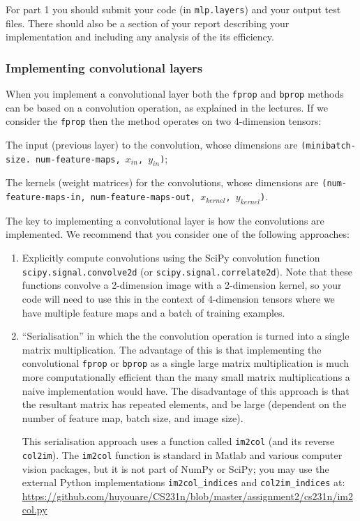 \documentclass[11pt,]{article}
\begin{document}
For part 1 you should submit  your code (in \texttt{mlp.layers}) and your output test files.  There should also be a section of your report describing your implementation and including any analysis of the its efficiency.

\subsubsection*{Implementing convolutional layers}
When you implement a convolutional layer both the \texttt{fprop} and \texttt{bprop} methods can be based on a convolution operation, as explained in the lectures.  If we consider the  \texttt{fprop} then the method operates on two 4-dimension tensors:
\begin{compactitem}
    \item The input (previous layer) to the convolution, whose dimensions are \texttt{(minibatch-size. num-feature-maps, $x_{in}$, $y_{in}$)};
    \item The kernels (weight matrices) for the convolutions,  whose dimensions are \texttt{(num-feature-maps-in, num-feature-maps-out, $x_{kernel}$, $y_{kernel}$)}.
\end{compactitem}

The key to implementing a convolutional layer is how the convolutions are implemented. We recommend that you consider one of the following approaches:
\begin{enumerate}
    \item Explicitly compute convolutions using the  SciPy convolution function \texttt{scipy.signal.convolve2d} (or \texttt{scipy.signal.correlate2d}).  Note that these functions convolve a 2-dimension image with a 2-dimension kernel, so your code will need to use this in the context of 4-dimension tensors where we have multiple feature maps and a batch of training examples.
    \item ``Serialisation'' in which the the convolution operation is turned into a single matrix multiplication.  The advantage of this is that implementing the convolutional \texttt{fprop} or \texttt{bprop} as a single large matrix multiplication is much more computationally efficient than the many small matrix multiplications a naive implementation would have.  The disadvantage of this approach is that the resultant matrix has repeated elements, and be large (dependent on the number of feature map, batch size, and image size).  
    
    This serialisation  approach uses a function called \texttt{im2col} (and its reverse \texttt{col2im}).  The \texttt{im2col} function is standard in Matlab and various computer vision packages, but it is not part of NumPy or SciPy; you may use the external Python implementations \texttt{im2col\_indices} and \texttt{col2im\_indices} at:\\ \url{https://github.com/huyouare/CS231n/blob/master/assignment2/cs231n/im2col.py}
\end{enumerate}
\end{document}
